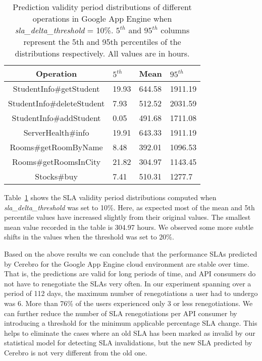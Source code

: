 \begin{table}
\begin{center}
\begin{tabular}{|c|p{1cm}|p{1cm}|p{1cm}|}
\hline
Operation & $5^{th}$ & Mean & $95^{th}$ \\ \hline
StudentInfo\#getStudent & 19.93 & 644.58 & 1911.19 \\ \hline
StudentInfo\#deleteStudent & 7.93 & 512.52 & 2031.59 \\ \hline
StudentInfo\#addStudent & 0.05 & 491.68 & 1711.08 \\ \hline
ServerHealth\#info & 19.91 & 643.33 & 1911.19 \\ \hline
Rooms\#getRoomByName & 8.48 & 392.01 & 1096.53 \\ \hline
Rooms\#getRoomsInCity & 21.82 & 304.97 & 1143.45 \\ \hline
Stocks\#buy & 7.41 & 510.31 & 1277.7 \\ \hline
\end{tabular}
\end{center}
\caption{Prediction validity period distributions of different operations in
Google App Engine when \textit{sla\_delta\_threshold} = 10\%. $5^{th}$ and $95^{th}$ 
columns represent the 5th and 95th percentiles of the
distributions respectively. All values are in hours.
\label{tab:validity_periods_sd10}
}
\end{table}

Table~\ref{tab:validity_periods_sd10} shows the SLA validity period distributions computed
when  \textit{sla\_delta\_threshold} was set to 10\%. Here, as expected  most of the mean and 5th
percentile values have increased slightly from their original values. The smallest mean value
recorded in the table is 304.97 hours. We observed some more subtle shifts in the values
when the threshold was set to 20\%.

Based on the above results we can conclude that the performance SLAs predicted by Cerebro 
for the Google App Engine cloud environment are stable over time. That is, the predictions are 
valid for long periods of time, and API consumers do not have to renegotiate the SLAs very 
often. In our experiment spanning over a period of 112
days, the maximum number of renegotiations a user had to undergo was 6. More than 76\% of
the users experienced only 3 or less renegotiations. We can further reduce the number of 
SLA renegotiations per API consumer by introducing a threshold for the minimum applicable
percentage SLA change. This helps to eliminate the cases where an old SLA has been marked as invalid
by our statistical model for detecting SLA invalidations, but the new SLA predicted by Cerebro is not
very different from the old one.